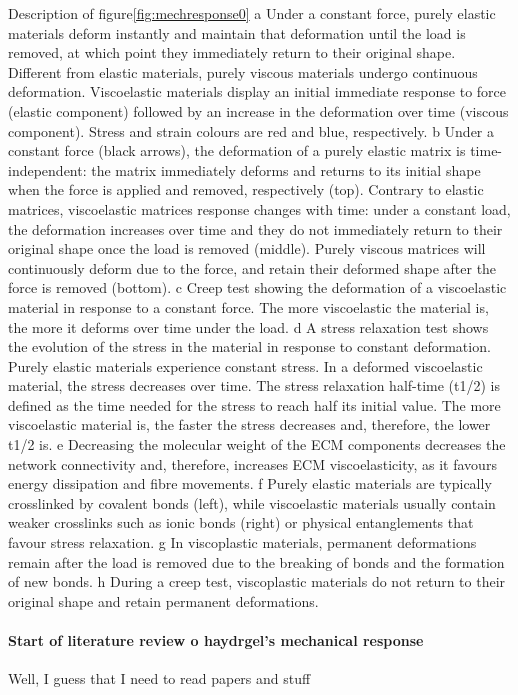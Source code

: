 Description of figure\ref{fig:mechresponse0} 
a Under a constant force, purely elastic materials deform instantly and maintain that deformation until the load is removed, at which point they immediately return to their original shape. Different from elastic materials, purely viscous materials undergo continuous deformation. Viscoelastic materials display an initial immediate response to force (elastic component) followed by an increase in the deformation over time (viscous component). Stress and strain colours are red and blue, respectively. b Under a constant force (black arrows), the deformation of a purely elastic matrix is time-independent: the matrix immediately deforms and returns to its initial shape when the force is applied and removed, respectively (top). Contrary to elastic matrices, viscoelastic matrices response changes with time: under a constant load, the deformation increases over time and they do not immediately return to their original shape once the load is removed (middle). Purely viscous matrices will continuously deform due to the force, and retain their deformed shape after the force is removed (bottom). c Creep test showing the deformation of a viscoelastic material in response to a constant force. The more  viscoelastic the material is, the more it deforms over time under the load. d A stress relaxation test shows the evolution of the stress in the material in response to constant deformation. Purely elastic materials experience constant stress. In a deformed viscoelastic material, the stress decreases over time. The stress relaxation half-time (t1/2) is defined as the time needed for the stress to reach half its initial value. The more viscoelastic material is, the faster the stress decreases and, therefore, the lower t1/2 is. e Decreasing the molecular weight of the ECM components decreases the network connectivity and, therefore, increases ECM viscoelasticity, as it favours energy dissipation and fibre movements. f Purely elastic materials are typically crosslinked by covalent bonds (left), while viscoelastic materials usually contain weaker crosslinks such as ionic bonds (right) or physical entanglements that favour stress relaxation. g In viscoplastic materials, permanent deformations remain after the load is removed due to the breaking of bonds and the formation of new bonds. h During a creep test, viscoplastic materials do not return to their original shape and retain permanent deformations\citep{courbotRoleExtracellularMatrix2025}.

\paragraph{Start of literature review o haydrgel's mechanical response} Well, I guess that I need to read papers and stuff%

